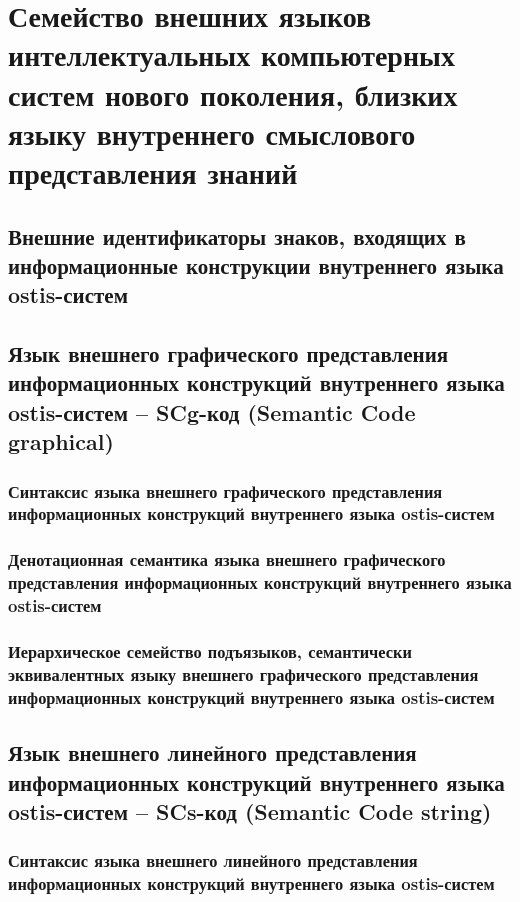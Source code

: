 \chapter{Семейство внешних языков интеллектуальных компьютерных систем нового поколения, близких языку внутреннего смыслового представления знаний}
\label{chapter_ext_lang}


\section{Внешние идентификаторы знаков, входящих в информационные конструкции внутреннего языка ostis-систем}
\section{Язык внешнего графического представления информационных конструкций внутреннего языка ostis-систем -- SCg-код (Semantic Code graphical)}
\subsection{Синтаксис языка внешнего графического представления информационных конструкций внутреннего языка ostis-систем}
\subsection{Денотационная семантика языка внешнего графического представления информационных конструкций внутреннего языка ostis-систем}
\subsection{Иерархическое семейство подъязыков, семантически эквивалентных языку внешнего графического представления информационных конструкций внутреннего языка ostis-систем}
\section{Язык внешнего линейного представления информационных конструкций внутреннего языка ostis-систем -- SCs-код (Semantic Code string)}
\subsection{Синтаксис языка внешнего линейного представления информационных конструкций внутреннего языка ostis-систем}
